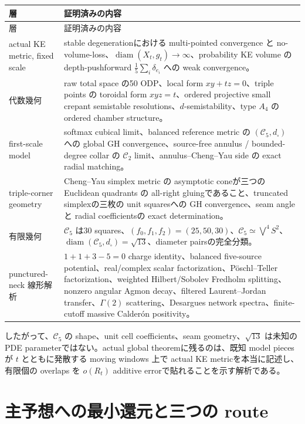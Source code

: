 \documentclass[11pt,a4paper]{ltjsarticle}
\newcommand{\cC}{\mathcal C}
\newcommand{\diam}{\operatorname{diam}}
\theoremstyle{plain}
\theoremstyle{definition}
\theoremstyle{remark}
\begin{document}
\begin{longtable}{>{\raggedright\arraybackslash}p{} >{\raggedright\arraybackslash}p{}}
\toprule
層 & 証明済みの内容\\
\midrule
\endfirsthead
\toprule
層 & 証明済みの内容\\
\midrule
\endhead
actual KE metric, fixed scale
& stable degenerationにおける multi-pointed convergence と no-volume-loss、$\diam(X_t,g_t)\to\infty$、probability KE volume の depth-pushforward
$\frac15\sum_i\delta_{e_i}$ への weak convergence。\\
\addlinespace
代数幾何
& raw total space の50 ODP、local form $xy+tz=0$、triple points の toroidal form $xyz=t$、ordered projective small crepant semistable resolutions、$d$-semistability、type $A_4$ の ordered chamber structure。\\
\addlinespace
first-scale model
& softmax cubical limit、balanced reference metric の $(\cC_5,d_\square)$ への global GH convergence、source-free annulus / bounded-degree collar の $\cC_2$ limit、annulus--Cheng--Yau side の exact radial matching。\\
\addlinespace
triple-corner geometry
& Cheng--Yau simplex metric の asymptotic coneが三つの Euclidean quadrants の all-right gluingであること、truncated simplexの三枚の unit squaresへの GH convergence、seam angleと radial coefficientsの exact determination。\\
\addlinespace
有限幾何
& $\cC_5$ は30 squares、$(f_0,f_1,f_2)=(25,50,30)$、$\cC_5\simeq\bigvee^4S^2$、
$\diam(\cC_5,d_\square)=\sqrt{13}$、diameter pairsの完全分類。\\
\addlinespace
punctured-neck 線形解析
& $1+1+3-5=0$ charge identity、balanced five-source potential、real/complex scalar factorization、Pöschl--Teller factorization、weighted Hilbert/Sobolev Fredholm splitting、nonzero angular Agmon decay、filtered Laurent--Jordan transfer、$\Gamma(2)$ scattering、Desargues network spectra、finite-cutoff massive Calderón positivity。\\
\bottomrule
\end{longtable}

したがって、$\cC_5$ の shape、unit cell coefficients、seam geometry、$\sqrt{13}$ は未知の PDE parameterではない。actual global theoremに残るのは、既知 model piecesが $t$ とともに発散する moving windows 上で actual KE metricを本当に記述し、有限個の overlaps を $o(R_t)$ additive errorで貼れることを示す解析である。

\section{主予想への最小還元と三つの route}\label{sec:reduction-v21}
\end{document}
